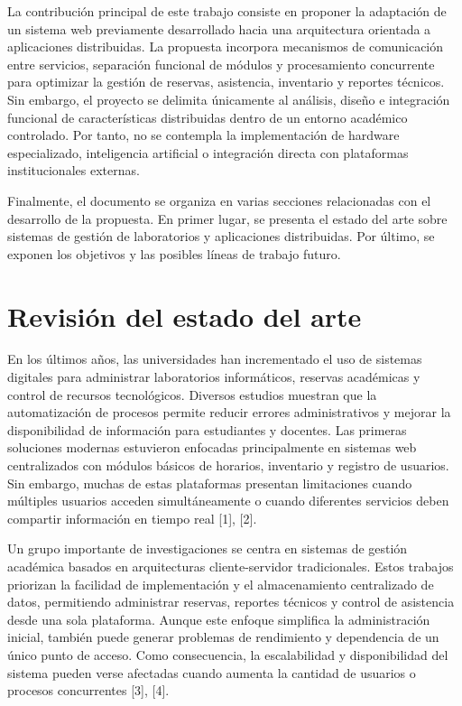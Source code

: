 \documentclass[12pt,a4paper]{article}
\begin{document}
\vspace{0.2cm}

La contribución principal de este trabajo consiste en proponer la adaptación de un sistema web previamente desarrollado hacia una arquitectura orientada a aplicaciones distribuidas. La propuesta incorpora mecanismos de comunicación entre servicios, separación funcional de módulos y procesamiento concurrente para optimizar la gestión de reservas, asistencia, inventario y reportes técnicos. Sin embargo, el proyecto se delimita únicamente al análisis, diseño e integración funcional de características distribuidas dentro de un entorno académico controlado. Por tanto, no se contempla la implementación de hardware especializado, inteligencia artificial o integración directa con plataformas institucionales externas.

\vspace{0.2cm}

Finalmente, el documento se organiza en varias secciones relacionadas con el desarrollo de la propuesta. En primer lugar, se presenta el estado del arte sobre sistemas de gestión de laboratorios y aplicaciones distribuidas. Por último, se exponen los objetivos y las posibles líneas de trabajo futuro.




\section{Revisión del estado del arte}

En los últimos años, las universidades han incrementado el uso de sistemas digitales para administrar laboratorios informáticos, reservas académicas y control de recursos tecnológicos. Diversos estudios muestran que la automatización de procesos permite reducir errores administrativos y mejorar la disponibilidad de información para estudiantes y docentes. Las primeras soluciones modernas estuvieron enfocadas principalmente en sistemas web centralizados con módulos básicos de horarios, inventario y registro de usuarios. Sin embargo, muchas de estas plataformas presentan limitaciones cuando múltiples usuarios acceden simultáneamente o cuando diferentes servicios deben compartir información en tiempo real [1], [2].

\vspace{0.2cm}

Un grupo importante de investigaciones se centra en sistemas de gestión académica basados en arquitecturas cliente-servidor tradicionales. Estos trabajos priorizan la facilidad de implementación y el almacenamiento centralizado de datos, permitiendo administrar reservas, reportes técnicos y control de asistencia desde una sola plataforma. Aunque este enfoque simplifica la administración inicial, también puede generar problemas de rendimiento y dependencia de un único punto de acceso. Como consecuencia, la escalabilidad y disponibilidad del sistema pueden verse afectadas cuando aumenta la cantidad de usuarios o procesos concurrentes [3], [4].
\end{document}
